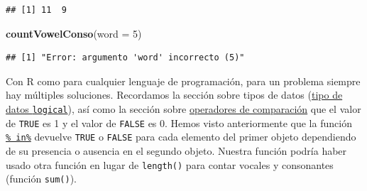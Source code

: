 \documentclass[
]{book}
\newenvironment{Shaded}{\begin{snugshade}}{\end{snugshade}}
\newcommand{\DataTypeTok}[1]{\textcolor[rgb]{0.13,0.29,0.53}{#1}}
\newcommand{\DecValTok}[1]{\textcolor[rgb]{0.00,0.00,0.81}{#1}}
\newcommand{\KeywordTok}[1]{\textcolor[rgb]{0.13,0.29,0.53}{\textbf{#1}}}
\newcommand{\NormalTok}[1]{#1}
\begin{document}
\begin{verbatim}
## [1] 11  9
\end{verbatim}

\begin{Shaded}
\begin{Highlighting}[]
\KeywordTok{countVowelConso}\NormalTok{(}\DataTypeTok{word =} \DecValTok{5}\NormalTok{)}
\end{Highlighting}
\end{Shaded}

\begin{verbatim}
## [1] "Error: argumento 'word' incorrecto (5)"
\end{verbatim}

Con R como para cualquier lenguaje de programación, para un problema siempre hay múltiples soluciones. Recordamos la sección sobre tipos de datos (\protect\hyperlink{l013logi}{tipo de datos \texttt{logical}}), así como la sección sobre \protect\hyperlink{l011opcomp}{operadores de comparación} que el valor de \texttt{TRUE} es 1 y el valor de \texttt{FALSE} es 0. Hemos visto anteriormente que la función \protect\hyperlink{l015in}{\texttt{\%\ in\%}} devuelve \texttt{TRUE} o \texttt{FALSE} para cada elemento del primer objeto dependiendo de su presencia o ausencia en el segundo objeto. Nuestra función podría haber usado otra función en lugar de \texttt{length()} para contar vocales y consonantes (función \texttt{sum()}).
\end{document}
